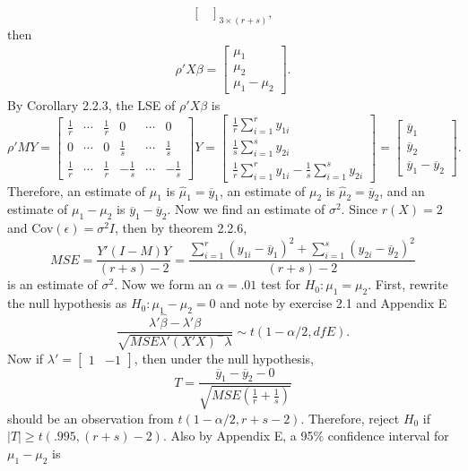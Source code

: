 \documentclass[11pt]{article}
\begin{document}
\begin{itemize}
\[\begin{bmatrix}
\end{bmatrix}_{3\times(r+s)},
\]
then
\begin{align*}
\rho' X\beta = \begin{bmatrix}
\mu_1 \\ \mu_2 \\ \mu_1 - \mu_2
\end{bmatrix}.
\end{align*}
By Corollary 2.2.3, the LSE of $\rho' X\beta$ is
\[
\rho'MY = \begin{bmatrix}
\frac{1}{r}  & \cdots & \frac{1}{r} & 0 & \cdots & 0 \\
0 & \cdots & 0 & \frac{1}{s} & \cdots & \frac{1}{s} \\
\frac{1}{r} & \cdots & \frac{1}{r} & -\frac{1}{s} & \cdots & -\frac{1}{s}
\end{bmatrix}Y = \begin{bmatrix}
\frac{1}{r}\sum_{i=1}^r y_{1i} \\
\frac{1}{s}\sum_{i=1}^s y_{2i} \\
 \frac{1}{r}\sum_{i=1}^r y_{1i} - \frac{1}{s}\sum_{i=1}^s y_{2i}
\end{bmatrix} = \begin{bmatrix}
\overline{y}_1 \\ \overline{y}_2 \\ \overline{y}_1 - \overline{y}_2
\end{bmatrix}.
\]
Therefore, an estimate of $\mu_1$ is $\widehat{\mu}_1 = \overline{y}_1$, an estimate of $\mu_2$ is $\widehat{\mu}_2 = \overline{y}_{2}$, and an estimate of $\mu_1 - \mu_2$ is $\overline{y}_1 - \overline{y}_2$.  Now we find an estimate of $\sigma^2$.  Since $r(X) = 2$ and Cov$(\epsilon) = \sigma^2I$, then by theorem 2.2.6, 
\[
MSE = \frac{Y'(I-M)Y}{(r+s)-2} = \frac{\sum_{i=1}^r(y_{1i}-\overline{y}_1)^2+\sum_{i=1}^s(y_{2i}-\overline{y}_2)^2}{(r+s)-2}
\]
is an estimate of $\sigma^2$.  Now we form an $\alpha = .01$ test for $H_0\colon \mu_1 = \mu_2$.  First, rewrite the null hypothesis as $H_0\colon \mu_1 - \mu_2 = 0$ and note by exercise 2.1 and Appendix E
\[
\frac{\lambda'\widehat{\beta} - \lambda'\beta}{\sqrt{MSE\lambda'(X'X)^-\lambda}} \sim t\left(1-\alpha/2, dfE\right).
\]
Now if $\lambda' = \begin{bmatrix}
1 & -1
\end{bmatrix}$, then under the null hypothesis,
\[
T = \frac{\overline{y}_1-\overline{y}_2 - 0}{\sqrt{MSE\left(\frac{1}{r}+\frac{1}{s}\right)}}
\]
should be an observation from $t(1-\alpha / 2, r+s-2)$.  Therefore, reject $H_0$ if $|T| \geq t(.995, (r+s)-2)$.  Also by Appendix E, a 95$\%$ confidence interval for $\mu_1-\mu_2$ is

\end{itemize}
\end{document}
